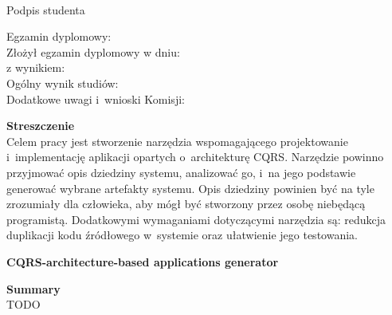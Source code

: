 \vspace{2cm}

\begin{flushright}
 \begin{minipage}{5cm}
  \dotfill \\[-0.7cm]
  \begin{center}
  \small Podpis studenta
  \end{center}
 \end{minipage}
\end{flushright}

\vspace{4cm}

\begin{flushleft}
 Egzamin dyplomowy: \\
 Złożył egzamin dyplomowy w dniu: \dotfill \\
 z wynikiem: \dotfill \\
 Ogólny wynik studiów: \dotfill \\
 Dodatkowe uwagi i~wnioski Komisji: \dotfill \\
 \hspace{0cm} \dotfill
\end{flushleft}

 
\newpage
\thispagestyle{empty}

\textbf{Streszczenie} \\

Celem pracy jest stworzenie narzędzia wspomagającego projektowanie i~implementację aplikacji opartych o~architekturę CQRS.
Narzędzie powinno przyjmować opis dziedziny systemu, analizować go, i~na jego podstawie generować wybrane artefakty systemu.
Opis dziedziny powinien być na tyle zrozumiały dla człowieka, aby mógł być stworzony przez osobę niebędącą programistą.
Dodatkowymi wymaganiami dotyczącymi narzędzia są: redukcja duplikacji kodu źródłowego w~systemie oraz ułatwienie jego testowania.




\begin{center}
 \large \textbf{CQRS-architecture-based applications generator}
\end{center}

\vspace*{1cm}

\textbf{Summary} \\

TODO

